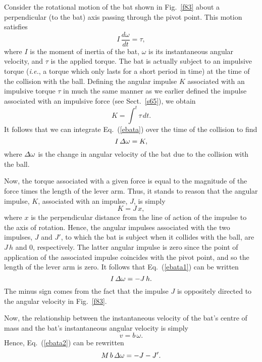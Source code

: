 Consider the rotational motion of the bat shown in Fig.~\ref{f83} about a perpendicular
(to the bat) axis passing through the pivot point. This motion satisfies
\begin{equation}\label{ebata}
I\,\frac{d\omega}{dt} = \tau,
\end{equation}
where $I$ is the moment of inertia of the bat, $\omega$ is its instantaneous angular velocity,
and $\tau$ is the applied torque. The bat is actually  subject to an
impulsive torque ({\em i.e.}, a torque which only lasts for a short period in time) at the
time of the collision with the ball. Defining the angular impulse $K$ associated with
an impulsive torque $\tau$ in much the same manner as we earlier defined
the impulse associated
with an impulsive force  (see Sect.~\ref{s65}), we obtain
\begin{equation}
K = \int^t \tau\,dt.
\end{equation}
It follows that we can integrate Eq.~(\ref{ebata}) over the time of the collision
to find
\begin{equation}\label{ebata1}
I\,{\mit\Delta}\omega = K,
\end{equation}
where ${\mit\Delta}\omega$ is the change in angular velocity of the bat due to the collision
with the ball.

Now, the torque associated with a given force is equal to the magnitude of the force times the 
length of the lever arm. Thus, it stands to reason that the angular impulse, $K$, associated
with an impulse, $J$,  is simply
\begin{equation}
K = J\,x,
\end{equation}
where $x$ is the perpendicular distance from the line of action of the impulse
to the axis of rotation. 
Hence, the angular impulses associated with the
two impulses, $J$ and $J'$, to which the bat is subject when it collides with the
ball, are $J\,h$ and $0$, respectively. The latter angular impulse is zero since the
point of application of the associated impulse coincides with the pivot point, and so
the length of the lever arm is zero. It follows that Eq.~(\ref{ebata1}) can be written
\begin{equation}\label{e8cx}
I\,{\mit\Delta}\omega = -J\,h.
\end{equation}
The minus sign comes from the fact that the
impulse $J$ is oppositely directed to the angular velocity in Fig.~\ref{f83}.

Now, the relationship between the instantaneous velocity of the bat's centre of mass
 and the bat's instantaneous angular velocity  is simply
\begin{equation}
v = b\, \omega.
\end{equation}
Hence, Eq.~(\ref{ebata2}) can be rewritten
\begin{equation}\label{e8cy}
M\,b\,{\mit\Delta} \omega = -J - J'.
\end{equation}


